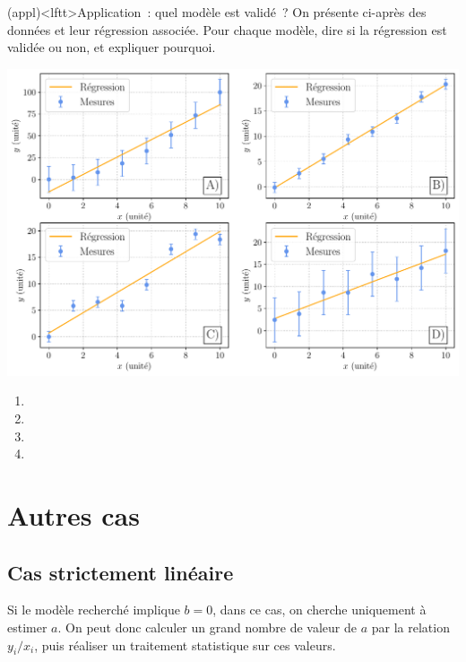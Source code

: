 \documentclass[a4paper, 12pt, garamond]{book}
\begin{document}
\begin{tcn}[breakable](appl)<lftt>{Application~: quel modèle est validé~?}
	On présente ci-après des données et leur régression associée. Pour chaque
	modèle, dire si la régression est validée ou non, et expliquer pourquoi.
	\begin{center}
		\includegraphics[width=\linewidth]{figures/reglin}
		\label{fig:reglin}
	\end{center}
	\tcblower
	\begin{enumerate}[label=\Alph*)]
		\item {}%
		\item {}%
		\item {}%
		\item {}%
	\end{enumerate}
\end{tcn}

\section{Autres cas}
\subsection{Cas strictement linéaire}
Si le modèle recherché implique $b = 0$, dans ce cas, on cherche uniquement à
estimer $a$. On peut donc calculer un grand nombre de valeur de $a$ par la
relation $y_i/x_i$, puis réaliser un traitement statistique sur ces valeurs.
\end{document}

